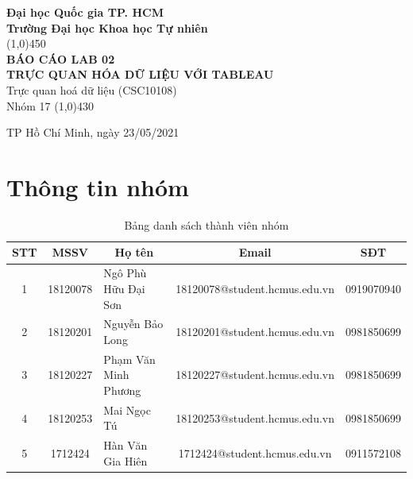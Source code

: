 \documentclass[a4paper, 12pt]{article}
\begin{document}
\begin{titlepage}
    \begin{center}
        \vspace*{1cm}
        \Large\textbf{Đại học Quốc gia TP. HCM\\Trường Đại học Khoa học Tự nhiên}\\

        \vfill
        \line(1,0){450}\\[4mm]
        \LARGE\textbf{\MakeUppercase{Báo cáo Lab 02\\ Trực quan hóa dữ liệu với Tableau}}\\[3mm]
        \Large{Trực quan hoá dữ liệu (CSC10108)}\\[3mm]
        \Large{Nhóm 17}
        \line(1,0){430}\\
        \vfill

        \vfill
        TP Hồ Chí Minh, ngày 23/05/2021
    \end{center}
\end{titlepage}

\tableofcontents
\thispagestyle{empty}
\clearpage

\section{Thông tin nhóm}
    \begin{table}[H]
        \begin{tabular}{|c|c|l|c|c|}
        \hline
        STT & MSSV     & \multicolumn{1}{c|}{Họ tên} & Email                         & SĐT        \\ \hline
        1   & 18120078 & Ngô Phù Hữu Đại Sơn         & 18120078@student.hcmus.edu.vn & 0919070940 \\ \hline
        2   & 18120201 & Nguyễn Bảo Long             & 18120201@student.hcmus.edu.vn & 0981850699 \\ \hline
        3   & 18120227 & Phạm Văn Minh Phương             & 18120227@student.hcmus.edu.vn & 0981850699 \\ \hline
        4   & 18120253 & Mai Ngọc Tú             & 18120253@student.hcmus.edu.vn & 0981850699 \\ \hline
        5   & 1712424 & Hàn Văn Gia Hiên            & 1712424@student.hcmus.edu.vn & 0911572108 \\ \hline
        \end{tabular}
        \caption{Bảng danh sách thành viên nhóm}
    \end{table}
    \clearpage
\end{document}
